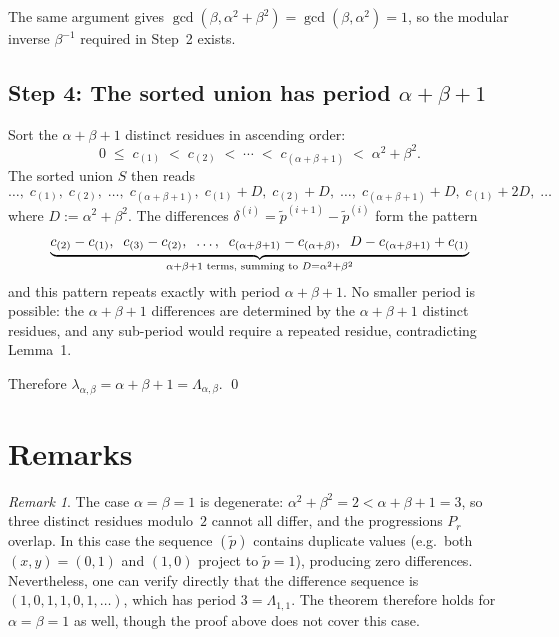 \documentclass[11pt]{article}
\theoremstyle{plain}
\theoremstyle{remark}
\newtheorem{remark}{Remark}
\begin{document}
The same argument gives $\gcd(\beta, \alpha^2+\beta^2) = \gcd(\beta, \alpha^2) = 1$,
so the modular inverse $\beta^{-1}$ required in Step~2 exists.

\subsection*{Step 4: The sorted union has period $\alpha + \beta + 1$}

Sort the $\alpha+\beta+1$ distinct residues in ascending order:
\[
    0 \;\le\; c_{(1)} \;<\; c_{(2)} \;<\; \cdots \;<\; c_{(\alpha+\beta+1)}
    \;<\; \alpha^2+\beta^2.
\]
The sorted union $S$ then reads
\[
    \ldots,\;
    c_{(1)},\; c_{(2)},\; \ldots,\; c_{(\alpha+\beta+1)},\;
    c_{(1)}+D,\; c_{(2)}+D,\; \ldots,\; c_{(\alpha+\beta+1)}+D,\;
    c_{(1)}+2D,\; \ldots
\]
where $D := \alpha^2+\beta^2$. The differences $\delta^{(i)} = \tilde{p}^{(i+1)} - \tilde{p}^{(i)}$
form the pattern
\[
    \underbrace{%
        c_{(2)}-c_{(1)},\;\;
        c_{(3)}-c_{(2)},\;\;
        \ldots,\;\;
        c_{(\alpha+\beta+1)}-c_{(\alpha+\beta)},\;\;
        D - c_{(\alpha+\beta+1)} + c_{(1)}
    }_{\alpha+\beta+1 \text{ terms, summing to } D = \alpha^2+\beta^2}
\]
and this pattern repeats exactly with period $\alpha+\beta+1$.
No smaller period is possible: the $\alpha+\beta+1$ differences are determined by the
$\alpha+\beta+1$ distinct residues, and any sub-period would require a repeated residue,
contradicting Lemma~1.

Therefore $\lambda_{\alpha,\beta} = \alpha + \beta + 1 = \Lambda_{\alpha,\beta}$. \qed

\section*{Remarks}

\begin{remark}\label{rem:degenerate}
The case $\alpha = \beta = 1$ is degenerate: $\alpha^2+\beta^2 = 2 < \alpha+\beta+1 = 3$,
so three distinct residues modulo~$2$ cannot all differ, and the progressions $P_r$
overlap. In this case the sequence $(\tilde{p})$ contains duplicate values
(e.g.\ both $(x,y) = (0,1)$ and $(1,0)$ project to $\tilde{p} = 1$),
producing zero differences. Nevertheless, one can verify directly that the difference
sequence is $(1, 0, 1, 1, 0, 1, \ldots)$, which has period $3 = \Lambda_{1,1}$.
The theorem therefore holds for $\alpha = \beta = 1$ as well, though the proof
above does not cover this case.
\end{remark}
\end{document}
